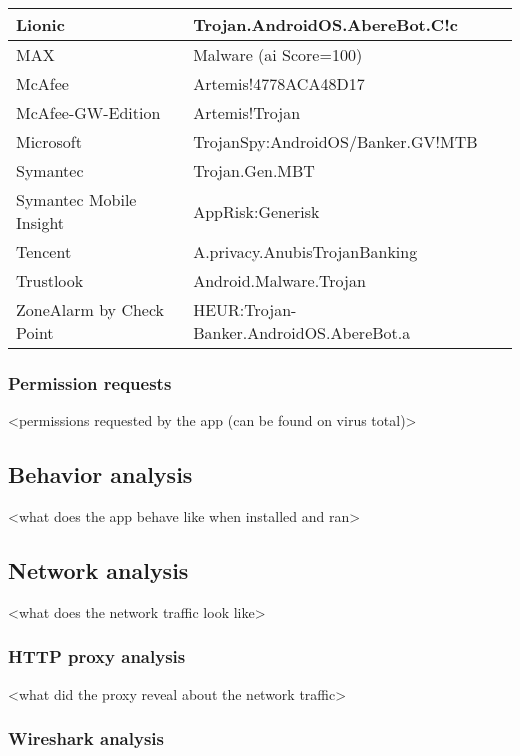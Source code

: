 \begin{tabular}{ |l|l| }
    \hline
        Lionic  &   Trojan.AndroidOS.AbereBot.C!c \\
    \hline
        MAX     &   Malware (ai Score=100) \\
    \hline
        McAfee  &   Artemis!4778ACA48D17 \\
    \hline
        McAfee-GW-Edition   &   Artemis!Trojan \\
    \hline
        Microsoft   &   TrojanSpy:AndroidOS/Banker.GV!MTB \\
    \hline
        Symantec    &   Trojan.Gen.MBT \\
    \hline
        Symantec Mobile Insight     &   AppRisk:Generisk \\
    \hline
        Tencent     &   A.privacy.AnubisTrojanBanking \\
    \hline
        Trustlook   &   Android.Malware.Trojan \\
    \hline
        ZoneAlarm by Check Point    &   HEUR:Trojan-Banker.AndroidOS.AbereBot.a \\
    \hline
\end{tabular}

\subsubsection{Permission requests}

<permissions requested by the app (can be found on virus total)>

\newpage
\subsection{Behavior analysis}

<what does the app behave like when installed and ran>

\newpage
\subsection{Network analysis}

<what does the network traffic look like>

\subsubsection{HTTP proxy analysis}

<what did the proxy reveal about the network traffic>

\subsubsection{Wireshark analysis}

